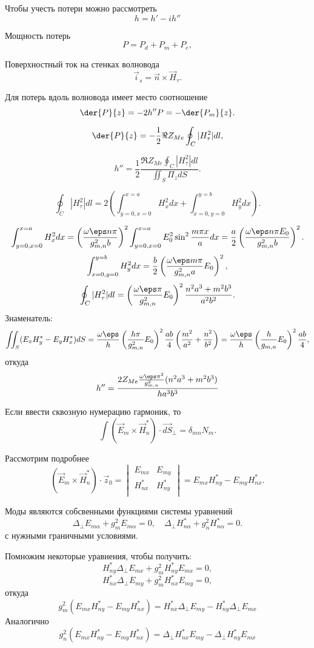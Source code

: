 Чтобы учесть потери можно рассмотреть
\[
	h = h' - ih''
\]

Мощность потерь
\[
	P = P_d + P_m + P_e,
\]

Поверхностный ток на стенках волновода
\[
	\vec{i}_s = \vec{n}\times\vec{H}_\tau.
\]

Для потерь вдоль волновода имеет место соотношение
\[
	\der{P}{z} = -2h''P = -\der{P_m}{z}.
\]

\[
	\der{P}{z} = -\frac{1}{2}\Re Z_{Me}\oint_C |H_\tau^2| dl,
\]

\[
	h'' = \frac{1}{2}\frac{\Re Z_{Me}\oint_C |H_\tau^2| dl}{\iint_S \Pi_z dS}.
\]

\[
	\oint_C |H_\tau^2| dl = 2 \left( \int_{y=0, x=0}^{x=a} H_x^2 dx +
	\int_{x=0, y=0}^{y=b} H_y^2 dx  \right).
\]

\[
\int_{y=0, x=0}^{x=a} H_x^2 dx = \left(\frac{\omega\eps n\pi}{g_{m,n}^2b}\right)^2\int_{y=0, x=0}^{x=a} E_0^2\sin^2\frac{m\pi x}{a} dx = \frac{a}{2}\left(\frac{\omega\eps n\pi E_0}{g_{m,n}^2b}\right)^2.
\]
\[
	\int_{x=0, y=0}^{y=b} H_y^2 dx = \frac{b}{2}\left(
	\frac{\omega\eps m\pi}{g_{m,n}^2a}E_0\right)^2,
\]
\[
	\oint_C |H_\tau^2| dl =\left(\frac{\omega\eps \pi}{g_{m,n}^2}E_0\right)^2 \frac{n^2a^3 + m^2b^3}{a^2b^2}.
\]
Знаменатель:
\[
	\iint_S (E_xH_y^* - E_yH_x^*) dS = \frac{\omega\eps}{h}
	\left(\frac{h\pi}{g_{m,n}^2}E_0\right)^2\frac{ab}{4}
	\left(\frac{m^2}{a^2}+\frac{n^2}{b^2}\right) =
	\frac{\omega\eps}{h}
	\left(\frac{h}{g_{m,n}}E_0\right)^2\frac{ab}{4},
\]
откуда
\[
	h'' = \frac{2Z_{Me}\frac{\omega\eps \pi^2}{g_{m,n}^2} (n^2a^3 + m^2b^3)}{ha^3b^3}
\]

Если ввести сквозную нумерацию гармоник, то
\[
	\int (\vec{E}_m\times\vec{H}_n^*)\cdot\vec{dS}_\perp = \delta_{mn}N_m.
\]

Рассмотрим подробнее
\[
	(\vec{E}_m\times\vec{H}_n^*)\cdot\vec{z}_0 =
	\begin{vmatrix}
		E_{mx} & E_{my}\\
		H_{nx}^* & H_{ny}^*\\
	\end{vmatrix}
	=
	E_{mx}H_{ny}^* - E_{my}H_{nx}^*.
\]

Моды являются собсвенными функциями системы уравнений
\[
	\Delta_\perp E_{m\alpha} + g_m^2 E_{m\alpha} = 0,\quad \Delta_\perp H_{n\alpha}^* + g_n^2 H_{n\alpha}^* = 0.
\]
с нужными граничными условиями.

Помножим некоторые уравнения, чтобы получить:
\[
	H_{ny}^*\Delta_\perp E_{mx} + g_m^2 H_{ny}^*E_{mx} = 0,
\]
\[
	H_{nx}^*\Delta_\perp E_{my} + g_m^2 H_{nx}^*E_{my} = 0,
\]
откуда
\[
	g_m^2(E_{mx}H_{ny}^* - E_{my}H_{nx}^*) = H_{nx}^*\Delta_\perp E_{my} - H_{ny}^*\Delta_\perp E_{mx}
\]
Аналогично
\[
	g_n^2(E_{mx}H_{ny}^* - E_{my}H_{nx}^*) = \Delta_\perp H_{nx}^* E_{my} - \Delta_\perp H_{ny}^* E_{mx}
\]

